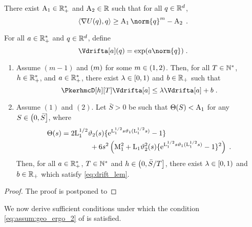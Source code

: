 \begin{assumption}[$m$]
  \label{assum:potential:c}
There exist $\operatorname{A}_1 \in \mathbb{R}^*_+$ and $\operatorname{A}_2 \in \mathbb{R}$ such that for all $q \in \mathbb{R}^d$,
  \begin{equation}
    \ps{\nabla \F(\q)}{\q} \geq \constthree \norm{\q}^{m} -\constfour \eqsp.
  \end{equation}
\end{assumption}
For all $a \in \mathbb{R}_+^*$ and $q \in \mathbb{R}^d$, define
\begin{equation}
\label{eq:def_Va}
\Vdrifta[a] (\q) = \exp(\a \norm{\q}) \eqsp.
\end{equation}
\begin{proposition}
\label{lem:drift_uhmc}
\begin{enumerate}[label=(\alph*)]
\item   \label{lem:drift_uhmc_1}
 Assume   $(m-1)$ and  $(m)$ for some $m \in \left(1,2\right)$. Then, for all $T \in \mathbb{N}^{*}$,  $h \in \mathbb{R}^*_+$, and $a \in \mathbb{R}^*_+$, there exist $\lambda \in \left[0,1\right)$ and $b \in \mathbb{R}_+$ such that
  \begin{equation}
    \label{eq:drift_lem}
      \PkerhmcD[h][T] \Vdrifta[\a] \leq \lambda  \Vdrifta[\a] + \b \eqsp.
  \end{equation}
\item
\label{lem:drift_uhmc_2}
 Assume   $ (1)$ and  $ (2)$.  Let $\bar{S} > 0$ be such that $\Theta(S) < \operatorname{A}_1$ for any $S \in \left(0,\bar{S}\right]$, where
\begin{align}
\label{eq:definition-function-C}
  \Theta(s)&= 2 \mathrm{L}_1^{1/2} \vartheta_2(s) \{ \mathrm{e}^{\mathrm{L}_1^{1/2} s \vartheta_1(\mathrm{L}_1^{1/2} s)} - 1\} \\
  & \qquad  \qquad + 6 s^2 \left(   \mathrm{M}_1 ^2  +  \mathrm{L}_1 \vartheta_2^2(s) \{ \mathrm{e}^{\mathrm{L}_1^{1/2} s \vartheta_1(\mathrm{L}_1^{1/2} s)} - 1\}^2\right) \;.
\end{align}
Then, for all $a \in \mathbb{R}^*_+$,  $T \in \mathbb{N}^{*}$ and  $h \in \left(0,\bar{S}/T\right]$,  there exist  $\lambda \in \left[0,1\right)$ and $b \in \mathbb{R}_+$ which satisfy \eqref{eq:drift_lem}.
\end{enumerate}
\end{proposition}
\begin{proof}
  The proof is postponed to 
\end{proof}
We now derive sufficient conditions under which the condition \eqref{eq:assum:geo_ergo_2} of
 is satisfied.

